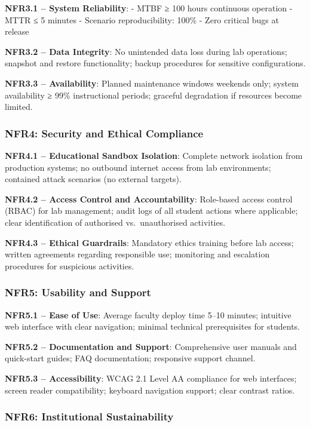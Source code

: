 \textbf{NFR3.1 -- System Reliability}: - MTBF ≥ 100 hours continuous operation - MTTR ≤ 5 minutes - Scenario reproducibility: 100\% - Zero critical bugs at release

\textbf{NFR3.2 -- Data Integrity}: No unintended data loss during lab operations; snapshot and restore functionality; backup procedures for sensitive configurations.

\textbf{NFR3.3 -- Availability}: Planned maintenance windows weekends only; system availability ≥ 99\% instructional periods; graceful degradation if resources become limited.

\subsubsection{NFR4: Security and Ethical Compliance}

\textbf{NFR4.1 -- Educational Sandbox Isolation}: Complete network isolation from production systems; no outbound internet access from lab environments; contained attack scenarios (no external targets).

\textbf{NFR4.2 -- Access Control and Accountability}: Role-based access control (RBAC) for lab management; audit logs of all student actions where applicable; clear identification of authorised vs.~unauthorised activities.

\textbf{NFR4.3 -- Ethical Guardrails}: Mandatory ethics training before lab access; written agreements regarding responsible use; monitoring and escalation procedures for suspicious activities.

\subsubsection{NFR5: Usability and Support}

\textbf{NFR5.1 -- Ease of Use}: Average faculty deploy time 5--10 minutes; intuitive web interface with clear navigation; minimal technical prerequisites for students.

\textbf{NFR5.2 -- Documentation and Support}: Comprehensive user manuals and quick-start guides; FAQ documentation; responsive support channel.

\textbf{NFR5.3 -- Accessibility}: WCAG 2.1 Level AA compliance for web interfaces; screen reader compatibility; keyboard navigation support; clear contrast ratios.

\subsubsection{NFR6: Institutional Sustainability}

